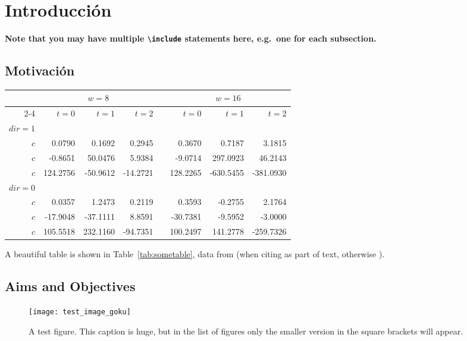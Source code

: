\chapter{Introducción}

\textbf{Note that you may have multiple \texttt{{\textbackslash}include} statements here, e.g.\ one for each subsection.}

\section{Motivación} %
\blindtext

\begin{table*}\centering
{}
\begin{tabular}{@{}rrrrcrrr@{}}\toprule
& \multicolumn{3}{c}{$w = 8$} & \phantom{abc}& \multicolumn{3}{c}{$w = 16$} \\
\cmidrule{2-4} \cmidrule{6-8} 
& $t=0$ & $t=1$ & $t=2$ && $t=0$ & $t=1$ & $t=2$\\ \midrule
$dir=1$\\
$c$ & 0.0790 & 0.1692 & 0.2945 && 0.3670 & 0.7187 & 3.1815\\
$c$ & -0.8651& 50.0476& 5.9384&& -9.0714& 297.0923& 46.2143\\
$c$ & 124.2756& -50.9612& -14.2721&& 128.2265& -630.5455& -381.0930\\
$dir=0$\\
$c$ & 0.0357& 1.2473& 0.2119&& 0.3593& -0.2755& 2.1764\\
$c$ & -17.9048& -37.1111& 8.8591&& -30.7381& -9.5952& -3.0000\\
$c$ & 105.5518& 232.1160& -94.7351&& 100.2497& 141.2778& -259.7326\\
\bottomrule
\end{tabular}
\caption{A Beautiful and Complex Table}\label{tab:sometable}
\end{table*}

A beautiful table is shown in Table~\ref{tab:sometable}, data from \citet{Ebejer2012} (when citing as part of text, otherwise \citep{Ebejer2012}).

\section{Aims and Objectives} 
\blindtext

\begin{figure}[ht!] %
  \centering
  \texttt{[image: test\_image\_goku]}
  \caption[This is the short caption for List of Figures]{A test figure.  This caption is huge, but in the list of figures only the smaller version in the square brackets will appear.}
  \label{fig:test1}
\end{figure}

